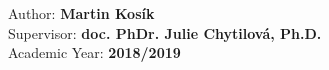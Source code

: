 \pagestyle{empty}

\vfill

\vglue 16cm

\noindent \large{Author: \textbf{Martin Kosík }}\\
\noindent \large{Supervisor: \textbf{doc. PhDr. Julie Chytilová, Ph.D.}}\\
\noindent \large{Academic Year: \textbf{2018/2019}}\\
\normalsize{}\\

